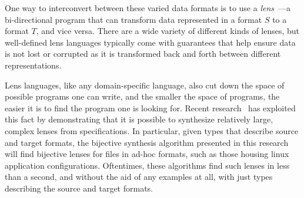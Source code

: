 \documentclass[acmsmall,screen,anonymous]{acmart}
\begin{document}
One way to interconvert between these varied data formats is to use a
\emph{lens}~\cite{?}---a bi-directional
program that can transform data represented in a format $S$ to a format $T$,
and vice versa.  There are a wide variety of different kinds of lenses, but well-defined lens
languages typically come with guarantees that help ensure data is
not lost or corrupted as it is transformed back and forth between different representations.

Lens languages, like any domain-specific language, also cut down the space of
possible programs one can write, and the smaller the space of programs,
the easier it is to find the program one is looking for.  
Recent research~\cite{optician, maina+:quotient-synthesis} has exploited this
fact by demonstrating that it is possible to synthesize relatively large,
complex lenses from specifications. In particular, given types that describe
source and target formats, the bijective synthesis algorithm presented in this
research will find bijective lenses
for files in ad-hoc formats, such as those housing linux application
configurations. Oftentimes, these algorithms find such lenses in less than a
second, and without the aid of any examples at all, with just types describing
the source and target formats.
\end{document}
